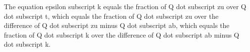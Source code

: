 The equation epsilon subscript k equals the fraction of Q dot subscript zu over Q dot subscript t, which equals the fraction of Q dot subscript zu over the difference of Q dot subscript zu minus Q dot subscript ab, which equals the fraction of Q dot subscript k over the difference of Q dot subscript ab minus Q dot subscript k.